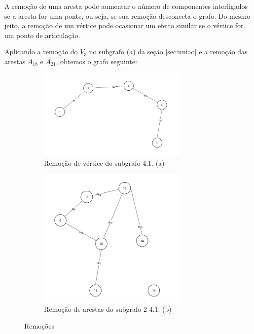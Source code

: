 A remoção de uma aresta pode aumentar o número de componentes interligados se a aresta for uma ponte, ou seja, se sua remoção desconecta o grafo. Do mesmo jeito, a remoção de um vértice pode ocasionar um efeito similar se o vértice for um ponto de articulação.

Aplicando a remoção do $V_3$ no subgrafo (a) da seção \ref{sec:uniao} e a remoção das arestas $A_{18}$ e $A_{21}$, obtemos o grafo seguinte:

\begin{figure}[!h]
	\centering %

	\begin{subfigure}[b]{0.48\textwidth}
		\centering
		\includegraphics[width=0.8\textwidth]{figuras/subgrafos/subgrafo_remocao_vertice.png} %
		\caption{Remoção de vértice do subgrafo 4.1. (a)}
		\label{fig:remocaoVertice}
	\end{subfigure}
	\hfill %
	\begin{subfigure}[b]{0.48\textwidth}
		\centering
		\includegraphics[width=0.8\textwidth]{figuras/subgrafos/subgrafo_remocao_aresta.png} %
		\caption{Remoção de arestas do subgrafo 2 4.1. (b)}
		\label{fig:remocaoAresta}
	\end{subfigure}

	\caption{Remoções}
	\label{fig:duasRemocoes}
\end{figure}

